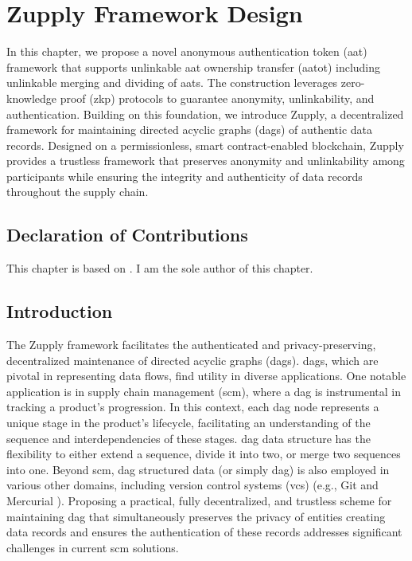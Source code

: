 \chapter{Zupply Framework Design}


In this chapter, we propose a novel anonymous authentication token (\gls{aat}) framework that supports unlinkable \gls{aat} ownership transfer (\gls{aatot}) including unlinkable merging and dividing of \gls{aat}s. The construction leverages zero-knowledge proof (\gls{zkp}) protocols to guarantee anonymity, unlinkability, and authentication. Building on this foundation, we introduce Zupply, a decentralized framework for maintaining directed acyclic graphs (\gls{dag}s) of authentic data records. Designed on a permissionless, smart contract-enabled blockchain, Zupply provides a trustless framework that preserves anonymity and unlinkability among participants while ensuring the integrity and authenticity of data records throughout the supply chain.

\section*{Declaration of Contributions}
This chapter is based on \cite{Badakhshan2024Zupply}. I am the sole author of this chapter.

\section{Introduction}

The Zupply framework facilitates the authenticated and privacy-preserving, decentralized maintenance of directed acyclic graphs (\gls{dag}s). \gls{dag}s, which are pivotal in representing data flows, find utility in diverse applications. One notable application is in supply chain management (\gls{scm}), where a \gls{dag} is instrumental in tracking a product's progression. In this context, each \gls{dag} node represents a unique stage in the product's lifecycle, facilitating an understanding of the sequence and interdependencies of these stages. \gls{dag} data structure has the flexibility to either extend a sequence, divide it into two, or merge two sequences into one. Beyond \gls{scm}, \gls{dag} structured data (or simply \gls{dag}) is also employed in various other domains, including version control systems (\gls{vcs}) (e.g., Git \cite{gitonline2023} and Mercurial \cite{mercurial}). Proposing a practical, fully decentralized, and trustless scheme for maintaining \gls{dag} that simultaneously preserves the privacy of entities creating data records and ensures the authentication of these records addresses significant challenges in current \gls{scm} solutions.

